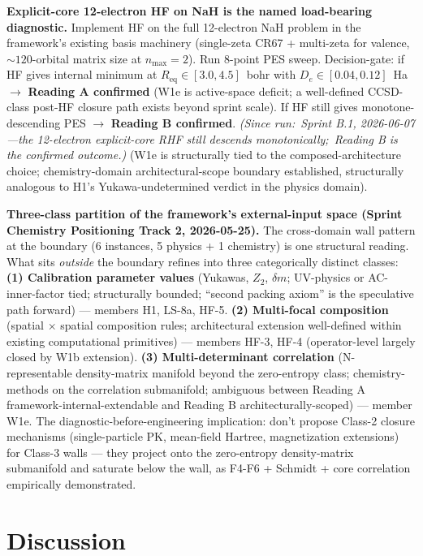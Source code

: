 \documentclass[aps,pra,twocolumn,superscriptaddress,longbibliography]{revtex4-2}
\begin{document}
\textbf{Explicit-core 12-electron HF on NaH is the
named load-bearing diagnostic.} Implement HF on the full 12-electron
NaH problem in the framework's existing basis machinery (single-zeta
CR67 + multi-zeta for valence, $\sim 120$-orbital matrix size at
$n_{\max} = 2$). Run 8-point PES sweep. Decision-gate: if HF gives
internal minimum at $R_\text{eq} \in [3.0, 4.5]$~bohr with
$D_e \in [0.04, 0.12]$~Ha $\rightarrow$ \textbf{Reading A confirmed}
(W1e is active-space deficit; a well-defined CCSD-class post-HF closure
path exists beyond sprint scale). If HF still gives monotone-descending PES
$\rightarrow$ \textbf{Reading B confirmed}.  \emph{(Since run:\ Sprint B.1,
2026-06-07---the 12-electron explicit-core RHF still descends monotonically;\
Reading B is the confirmed outcome.)} (W1e is structurally tied
to the composed-architecture choice; chemistry-domain
architectural-scope boundary established, structurally analogous to
H1's Yukawa-undetermined verdict in the physics domain).

\textbf{Three-class partition of the framework's external-input
space (Sprint Chemistry Positioning Track 2, 2026-05-25).}
The cross-domain wall pattern at the boundary (6 instances, 5
physics + 1 chemistry) is one structural reading. What sits
\emph{outside} the boundary refines into three categorically
distinct classes: \textbf{(1) Calibration parameter values}
(Yukawas, $Z_2$, $\delta m$; UV-physics or AC-inner-factor tied;
structurally bounded; ``second packing axiom'' is the speculative
path forward) --- members H1, LS-8a, HF-5. \textbf{(2) Multi-focal
composition} (spatial $\times$ spatial composition rules; architectural
extension well-defined within existing computational primitives) ---
members HF-3, HF-4 (operator-level largely closed by W1b extension).
\textbf{(3) Multi-determinant correlation} (N-representable
density-matrix manifold beyond the zero-entropy class; chemistry-methods
on the correlation submanifold; ambiguous between Reading A
framework-internal-extendable and Reading B
architecturally-scoped) --- member W1e. The diagnostic-before-engineering
implication: don't propose Class-2 closure mechanisms (single-particle PK,
mean-field Hartree, magnetization extensions) for Class-3 walls --- they
project onto the zero-entropy density-matrix submanifold and saturate
below the wall, as F4-F6 + Schmidt + core correlation empirically
demonstrated.

\section{Discussion}
\label{sec:discussion}
\end{document}
